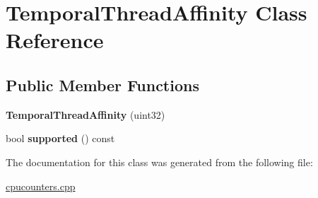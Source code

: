 \hypertarget{class_temporal_thread_affinity}{}\section{Temporal\+Thread\+Affinity Class Reference}
\label{class_temporal_thread_affinity}
\subsection*{Public Member Functions}
\begin{DoxyCompactItemize}
\item 
\mbox{\label{class_temporal_thread_affinity_adc237efcc45938f0c188e705b2ed226e}} 
{\bfseries Temporal\+Thread\+Affinity} (uint32)
\item 
\mbox{\label{class_temporal_thread_affinity_aae90a72724e0fbb83b3e9607679d27ca}} 
bool {\bfseries supported} () const
\end{DoxyCompactItemize}


The documentation for this class was generated from the following file\+:\begin{DoxyCompactItemize}
\item 
\mbox{\hyperlink{cpucounters_8cpp}{cpucounters.\+cpp}}\end{DoxyCompactItemize}
